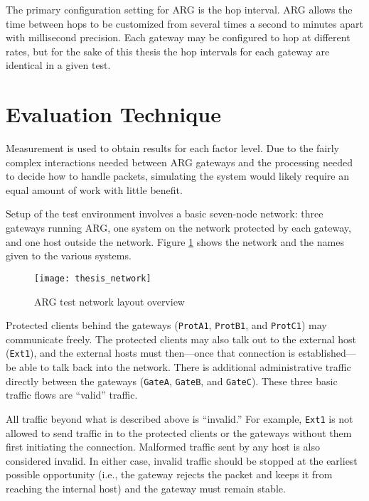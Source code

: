 \par The primary configuration setting for \ac{ARG} is the hop interval. \ac{ARG} allows the time between hops to be customized from several times a second to minutes apart with millisecond precision. Each gateway may be configured to hop at different rates, but for the sake of this thesis the hop intervals for each gateway are identical in a given test. 

\section{Evaluation Technique}
\label{sec:eval_technique}
\par Measurement is used to obtain results for each factor level. Due to the fairly complex interactions needed between \ac{ARG} gateways and the processing needed to decide how to handle packets, simulating the system would likely require an equal amount of work with little benefit.

\par Setup of the test environment involves a basic seven-node network: three gateways running \ac{ARG}, one system on the network protected by each gateway, and one host outside the network. Figure \ref{fig:argnetwork} shows the network and the names given to the various systems.

\begin{figure}
	\centering
	\caption{\ac{ARG} test network layout overview}
	\label{fig:argnetwork}
	\texttt{[image: thesis\_network]}
\end{figure}

\par Protected clients behind the gateways (\texttt{ProtA1}, \texttt{ProtB1}, and \texttt{ProtC1}) may communicate freely. The protected clients may also talk out to the external host (\texttt{Ext1}), and the external hosts must then---once that connection is established---be able to talk back into the network. There is additional administrative traffic directly between the gateways (\texttt{GateA}, \texttt{GateB}, and \texttt{GateC}). These three basic traffic flows are ``valid'' traffic.

\par All traffic beyond what is described above is ``invalid.'' For example, \texttt{Ext1} is not allowed to send traffic in to the protected clients or the gateways without them first initiating the connection. Malformed traffic sent by any host is also considered invalid. In either case, invalid traffic should be stopped at the earliest possible opportunity (i.e., the gateway rejects the packet and keeps it from reaching the internal host) and the gateway must remain stable.

